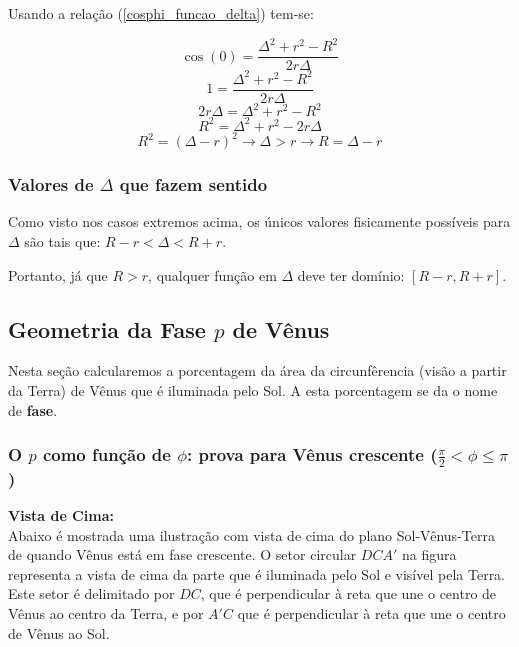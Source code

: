 \documentclass[a4paper, 12pt]{article}
\begin{document}
Usando a relação (\ref{cosphi_funcao_delta}) tem-se:

$$\cos \left(0 \right)=\frac{\Delta ^2+r^2-R^2}{2r\Delta }$$
$$1=\frac{\Delta ^2+r^2-R^2}{2r\Delta }$$
$$2r\Delta =\Delta ^2+r^2-R^2$$
$$R^2=\Delta ^2+r^2-2r\Delta $$
$$R^2=\left(\Delta -r\right)^2\longrightarrow \Delta >r\longrightarrow \boxed{R=\Delta -r}$$

\subsubsection{Valores de $\Delta$ que fazem sentido}
Como visto nos casos extremos acima, os únicos valores fisicamente possíveis para $\Delta$ são tais que: $R-r<\Delta <R+r$. 

Portanto, já que $R>r$, qualquer função em $\Delta$ deve ter domínio: $\left[R-r{,}R+r\right]$.


\subsection{Geometria da Fase $p$ de Vênus}
Nesta seção calcularemos a porcentagem da área da circunfêrencia (visão a partir da Terra) de Vênus que é iluminada pelo Sol. A esta porcentagem se da o nome de \textbf{fase}.

\subsubsection{O $p$ como função de $\phi$: prova para Vênus crescente ($\frac{\pi }{2}<\phi \le \pi$)}

\textbf{Vista de Cima:}\\

Abaixo é mostrada uma ilustração com vista de cima do plano Sol-Vênus-Terra de quando Vênus está em fase crescente. O setor circular $DCA'$ na figura representa a vista de cima da parte que é iluminada pelo Sol e visível pela Terra. Este setor é delimitado por $DC$, que é perpendicular à reta que une o centro de Vênus ao centro da Terra, e por $A'C$ que é perpendicular à reta que une o centro de Vênus ao Sol.
\end{document}
